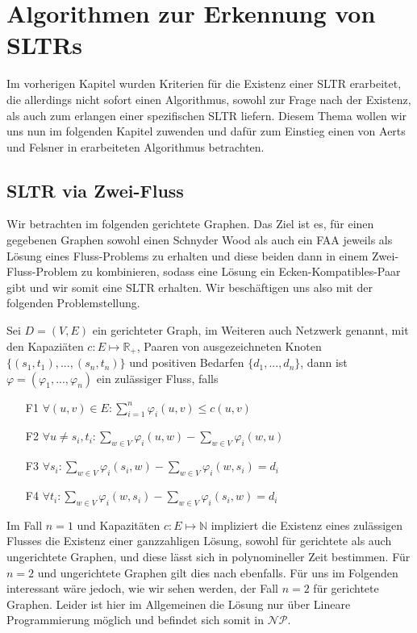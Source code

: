 \chapter{Algorithmen zur Erkennung von SLTRs}

Im vorherigen Kapitel wurden Kriterien für die Existenz einer SLTR erarbeitet, die allerdings nicht sofort einen Algorithmus, sowohl zur Frage nach der Existenz, als auch zum erlangen einer spezifischen SLTR liefern. Diesem Thema wollen wir uns nun im folgenden Kapitel zuwenden und dafür zum Einstieg einen von Aerts und Felsner in \cite{af13} erarbeiteten Algorithmus betrachten.

\section{SLTR via Zwei-Fluss}

Wir betrachten im folgenden gerichtete Graphen. Das Ziel ist es, für einen gegebenen Graphen sowohl einen Schnyder Wood als auch ein FAA jeweils als Lösung eines Fluss-Problems zu erhalten und diese beiden dann in einem Zwei-Fluss-Problem zu kombinieren, sodass eine Lösung ein Ecken-Kompatibles-Paar gibt und wir somit eine SLTR erhalten. Wir beschäftigen uns also mit der folgenden Problemstellung.

\begin{definition}
Sei $D=(V,E)$ ein gerichteter Graph, im Weiteren auch Netzwerk genannt, mit den Kapaziäten $c:E\mapsto\mathbb{R}_{+}$, Paaren von ausgezeichneten Knoten $\{(s_1,t_1), ... ,(s_n,t_n)\}$ und positiven Bedarfen $\{d_1, ... ,d_n\}$, dann ist $\varphi=(\varphi_1, ... ,\varphi_n)$ ein zulässiger Fluss, falls
\begin{itemize}
\item[F1] $\forall (u,v) \in E : \sum_{i=1}^{n}{\varphi_i(u,v)} \leq c(u,v) $
\item[F2] $ \forall u \neq s_i,t_i : \sum_{w \in V} \varphi_i(u,w) - \sum_{w \in V} \varphi_i(w,u) $
\item[F3] $ \forall s_i : \sum_{w \in V} \varphi_i(s_i,w) - \sum_{w \in V} \varphi_i(w,s_i) = d_i $
\item[F4] $ \forall t_i : \sum_{w \in V} \varphi_i(w,s_i) - \sum_{w \in V} \varphi_i(s_i,w) = d_i $
\end{itemize}
\end{definition}

\begin{remark}
Im Fall $n=1$ und Kapazitäten $c:E\mapsto\mathbb{N}$ impliziert die Existenz eines zulässigen Flusses die Existenz einer ganzzahligen Lösung, sowohl für gerichtete als auch ungerichtete Graphen, und diese lässt sich in polynomineller Zeit bestimmen. Für $n=2$ und ungerichtete Graphen gilt dies nach \cite{hu} ebenfalls. Für uns im Folgenden interessant wäre jedoch, wie wir sehen werden, der Fall $n=2$ für gerichtete Graphen. Leider ist hier im Allgemeinen die Lösung nur über Lineare Programmierung möglich und befindet sich somit in $\mathcal{NP}$.
\end{remark}

